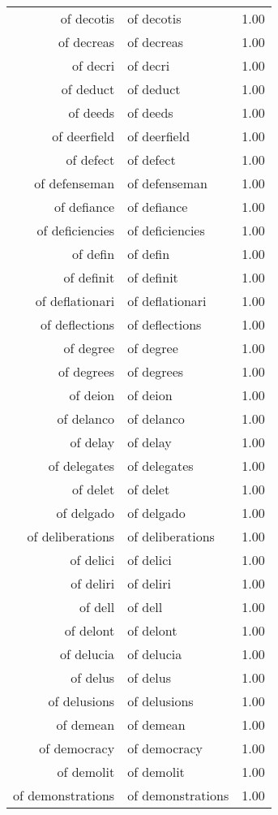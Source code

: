 \begin{table}[ht]
\begin{tabular}{rlr}
  of decotis & of decotis & 1.00 \\ 
  of decreas & of decreas & 1.00 \\ 
  of decri & of decri & 1.00 \\ 
  of deduct & of deduct & 1.00 \\ 
  of deeds & of deeds & 1.00 \\ 
  of deerfield & of deerfield & 1.00 \\ 
  of defect & of defect & 1.00 \\ 
  of defenseman & of defenseman & 1.00 \\ 
  of defiance & of defiance & 1.00 \\ 
  of deficiencies & of deficiencies & 1.00 \\ 
  of defin & of defin & 1.00 \\ 
  of definit & of definit & 1.00 \\ 
  of deflationari & of deflationari & 1.00 \\ 
  of deflections & of deflections & 1.00 \\ 
  of degree & of degree & 1.00 \\ 
  of degrees & of degrees & 1.00 \\ 
  of deion & of deion & 1.00 \\ 
  of delanco & of delanco & 1.00 \\ 
  of delay & of delay & 1.00 \\ 
  of delegates & of delegates & 1.00 \\ 
  of delet & of delet & 1.00 \\ 
  of delgado & of delgado & 1.00 \\ 
  of deliberations & of deliberations & 1.00 \\ 
  of delici & of delici & 1.00 \\ 
  of deliri & of deliri & 1.00 \\ 
  of dell & of dell & 1.00 \\ 
  of delont & of delont & 1.00 \\ 
  of delucia & of delucia & 1.00 \\ 
  of delus & of delus & 1.00 \\ 
  of delusions & of delusions & 1.00 \\ 
  of demean & of demean & 1.00 \\ 
  of democracy & of democracy & 1.00 \\ 
  of demolit & of demolit & 1.00 \\ 
  of demonstrations & of demonstrations & 1.00 \\ 

\end{tabular}
\end{table}
